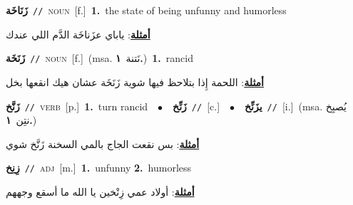 \documentclass[10pt,a4paper,twoside]{article} %
\begin{document}
\begin{multicols}{2}
{\setlength\topsep{0pt}\textbf{\foreignlanguage{arabic}{زَنَاخَة}}\ {\color{gray}\texttt{//}\color{black}}\ \textsc{noun}\ [f.]\ \textbf{1.}~the state of being unfunny and humorless\  \begin{flushright}\color{gray}\foreignlanguage{arabic}{\textbf{\underline{\foreignlanguage{arabic}{أمثلة}}}: ياباي عزَناخَة الدَّم اللي عندك}\end{flushright}\color{black}} \vspace{2mm}

{\setlength\topsep{0pt}\textbf{\foreignlanguage{arabic}{زَنَخَة}}\ {\color{gray}\texttt{//}\color{black}}\ \textsc{noun}\ [f.]\ \color{gray}(msa. \foreignlanguage{arabic}{نَتنة}~\foreignlanguage{arabic}{\textbf{١.}})\color{black}\ \textbf{1.}~rancid\  \begin{flushright}\color{gray}\foreignlanguage{arabic}{\textbf{\underline{\foreignlanguage{arabic}{أمثلة}}}: اللحمة إِذا بتلاحظ فيها شوية زَنَخَة عشان هيك انقعها بخل}\end{flushright}\color{black}} \vspace{2mm}

{\setlength\topsep{0pt}\textbf{\foreignlanguage{arabic}{زَنَّخ}}\ {\color{gray}\texttt{//}\color{black}}\ \textsc{verb}\ [p.]\ \textbf{1.}~turn rancid\ \ $\bullet$\ \ \setlength\topsep{0pt}\textbf{\foreignlanguage{arabic}{زَنِّخ}}\ {\color{gray}\texttt{//}\color{black}}\ [c.]\ \ $\bullet$\ \ \setlength\topsep{0pt}\textbf{\foreignlanguage{arabic}{يزَنِّخ}}\ {\color{gray}\texttt{//}\color{black}}\ [i.]\ \color{gray}(msa. \foreignlanguage{arabic}{يُصبِخ نتِن}~\foreignlanguage{arabic}{\textbf{١.}})\color{black}\  \begin{flushright}\color{gray}\foreignlanguage{arabic}{\textbf{\underline{\foreignlanguage{arabic}{أمثلة}}}: بس نقعت الجاج بالمي السخنة زَنَّخ شوي}\end{flushright}\color{black}} \vspace{2mm}

{\setlength\topsep{0pt}\textbf{\foreignlanguage{arabic}{زِنِخ}}\ {\color{gray}\texttt{//}\color{black}}\ \textsc{adj}\ [m.]\ \textbf{1.}~unfunny  \textbf{2.}~humorless\  \begin{flushright}\color{gray}\foreignlanguage{arabic}{\textbf{\underline{\foreignlanguage{arabic}{أمثلة}}}: أولاد عمي زِنْخين يا الله ما أسقع وجههم}\end{flushright}\color{black}} \vspace{2mm}


\end{multicols}
\end{document}
